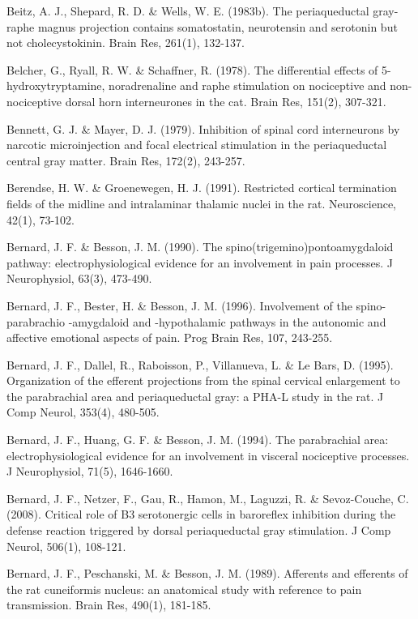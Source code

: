 \documentclass[a4paper,12pt,twoside]{report}
\begin{document}
\begin{singlespacing}
\begin{footnotesize}
Beitz, A. J., Shepard, R. D. \& Wells, W. E. (1983b). The periaqueductal gray-raphe magnus projection contains somatostatin, neurotensin and serotonin but not cholecystokinin. Brain Res, 261(1), 132-137.

Belcher, G., Ryall, R. W. \& Schaffner, R. (1978). The differential effects of 5-hydroxytryptamine, noradrenaline and raphe stimulation on nociceptive and non-nociceptive dorsal horn interneurones in the cat. Brain Res, 151(2), 307-321.

Bennett, G. J. \& Mayer, D. J. (1979). Inhibition of spinal cord interneurons by narcotic microinjection and focal electrical stimulation in the periaqueductal central gray matter. Brain Res, 172(2), 243-257.

Berendse, H. W. \& Groenewegen, H. J. (1991). Restricted cortical termination fields of the midline and intralaminar thalamic nuclei in the rat. Neuroscience, 42(1), 73-102.

Bernard, J. F. \& Besson, J. M. (1990). The spino(trigemino)\linebreak pontoamygdaloid pathway: electrophysiological evidence for an involvement in pain processes. J Neurophysiol, 63(3), 473-490.

Bernard, J. F., Bester, H. \& Besson, J. M. (1996). Involvement of the spino-parabrachio -amygdaloid and -hypothalamic pathways in the autonomic and affective emotional aspects of pain. Prog Brain Res, 107, 243-255.

Bernard, J. F., Dallel, R., Raboisson, P., Villanueva, L. \& Le Bars, D. (1995). Organization of the efferent projections from the spinal cervical enlargement to the parabrachial area and periaqueductal gray: a PHA-L study in the rat. J Comp Neurol, 353(4), 480-505.

Bernard, J. F., Huang, G. F. \& Besson, J. M. (1994). The parabrachial area: electrophysiological evidence for an involvement in visceral nociceptive processes. J Neurophysiol, 71(5), 1646-1660.

Bernard, J. F., Netzer, F., Gau, R., Hamon, M., Laguzzi, R. \& Sevoz-Couche, C. (2008). Critical role of B3 serotonergic cells in baroreflex inhibition during the defense reaction triggered by dorsal periaqueductal gray stimulation. J Comp Neurol, 506(1), 108-121.

Bernard, J. F., Peschanski, M. \& Besson, J. M. (1989). Afferents and efferents of the rat cuneiformis nucleus: an anatomical study with reference to pain transmission. Brain Res, 490(1), 181-185.


\end{footnotesize}
\end{singlespacing}
\end{document}
